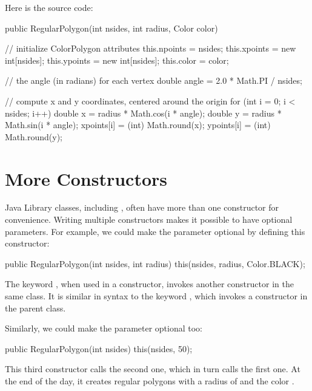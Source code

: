 Here is the source code:

\begin{code}
public RegularPolygon(int nsides, int radius, Color color) {

    // initialize ColorPolygon attributes
    this.npoints = nsides;
    this.xpoints = new int[nsides];
    this.ypoints = new int[nsides];
    this.color = color;

    // the angle (in radians) for each vertex
    double angle = 2.0 * Math.PI / nsides;

    // compute x and y coordinates, centered around the origin
    for (int i = 0; i < nsides; i++) {
        double x = radius * Math.cos(i * angle);
        double y = radius * Math.sin(i * angle);
        xpoints[i] = (int) Math.round(x);
        ypoints[i] = (int) Math.round(y);
    }
}
\end{code}



\section{More Constructors}

Java Library classes, including , often have more than one constructor for convenience.
Writing multiple constructors makes it possible to have optional parameters.
For example, we could make the  parameter optional by defining this constructor:

\begin{code}
public RegularPolygon(int nsides, int radius) {
    this(nsides, radius, Color.BLACK);
}
\end{code}

The keyword , when used in a constructor, invokes another constructor in the same class.
It is similar in syntax to the keyword , which invokes a constructor in the parent class.

Similarly, we could make the  parameter optional too:

\begin{code}
public RegularPolygon(int nsides) {
    this(nsides, 50);
}
\end{code}

This third constructor calls the second one, which in turn calls the first one.
At the end of the day, it creates regular polygons with a radius of  and the color .

